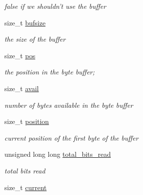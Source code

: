 \begin{DoxyCompactItemize}
\begin{DoxyCompactList}\small\item\em false if we shouldn't use the buffer \end{DoxyCompactList}\item 
\hypertarget{structbitfile__tag_a9c58837ca594d48ee58759d21c7427d2}{size\+\_\+t \hyperlink{structbitfile__tag_a9c58837ca594d48ee58759d21c7427d2}{bufsize}}\label{structbitfile__tag_a9c58837ca594d48ee58759d21c7427d2}

\begin{DoxyCompactList}\small\item\em the size of the buffer \end{DoxyCompactList}\item 
\hypertarget{structbitfile__tag_a7c8a8d917f2587b8566466c6fd2ba968}{size\+\_\+t \hyperlink{structbitfile__tag_a7c8a8d917f2587b8566466c6fd2ba968}{pos}}\label{structbitfile__tag_a7c8a8d917f2587b8566466c6fd2ba968}

\begin{DoxyCompactList}\small\item\em the position in the byte buffer; \end{DoxyCompactList}\item 
\hypertarget{structbitfile__tag_a3f00016550e1ab6220d346496f9e9182}{size\+\_\+t \hyperlink{structbitfile__tag_a3f00016550e1ab6220d346496f9e9182}{avail}}\label{structbitfile__tag_a3f00016550e1ab6220d346496f9e9182}

\begin{DoxyCompactList}\small\item\em number of bytes available in the byte buffer \end{DoxyCompactList}\item 
size\+\_\+t \hyperlink{structbitfile__tag_a8c2eb7c5b5312471f74c68ba93231f7c}{position}
\begin{DoxyCompactList}\small\item\em current position of the first byte of the buffer \end{DoxyCompactList}\item 
\hypertarget{structbitfile__tag_a39d1b38801c21529894f15a362741bb4}{unsigned long long \hyperlink{structbitfile__tag_a39d1b38801c21529894f15a362741bb4}{total\+\_\+bits\+\_\+read}}\label{structbitfile__tag_a39d1b38801c21529894f15a362741bb4}

\begin{DoxyCompactList}\small\item\em total bits read \end{DoxyCompactList}\item 
\hypertarget{structbitfile__tag_a97ba7a275396a5960058f45eac93f04f}{size\+\_\+t \hyperlink{structbitfile__tag_a97ba7a275396a5960058f45eac93f04f}{current}}\label{structbitfile__tag_a97ba7a275396a5960058f45eac93f04f}


\end{DoxyCompactItemize}
